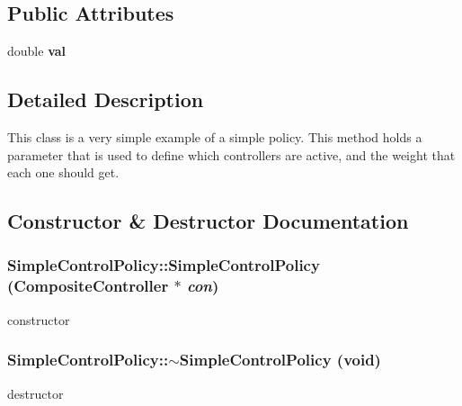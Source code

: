 \subsection*{Public Attributes}
\begin{DoxyCompactItemize}
\item 
\hypertarget{classCartWheel_1_1Core_1_1SimpleControlPolicy_a62e004f19058f56b9e8789971f05f3ad}{
double {\bfseries val}}
\label{classCartWheel_1_1Core_1_1SimpleControlPolicy_a62e004f19058f56b9e8789971f05f3ad}

\end{DoxyCompactItemize}


\subsection{Detailed Description}
This class is a very simple example of a simple policy. This method holds a parameter that is used to define which controllers are active, and the weight that each one should get. 

\subsection{Constructor \& Destructor Documentation}
\hypertarget{classCartWheel_1_1Core_1_1SimpleControlPolicy_a4564f02bdcf4163997cf4984a4acec9d}{
\subsubsection[{SimpleControlPolicy}]{\setlength{\rightskip}{0pt plus 5cm}SimpleControlPolicy::SimpleControlPolicy ({\bf CompositeController} $\ast$ {\em con})}}
\label{classCartWheel_1_1Core_1_1SimpleControlPolicy_a4564f02bdcf4163997cf4984a4acec9d}
constructor \hypertarget{classCartWheel_1_1Core_1_1SimpleControlPolicy_a2306ebfbe0a4ceba56e7e3e4408f898e}{
\subsubsection[{$\sim$SimpleControlPolicy}]{\setlength{\rightskip}{0pt plus 5cm}SimpleControlPolicy::$\sim$SimpleControlPolicy (void)}}
\label{classCartWheel_1_1Core_1_1SimpleControlPolicy_a2306ebfbe0a4ceba56e7e3e4408f898e}
destructor 

